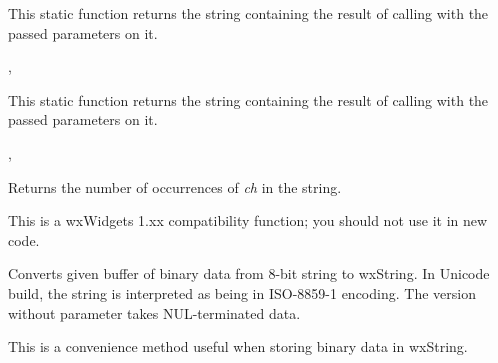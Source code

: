 \label{wxstringformat}


This static function returns the string containing the result of calling 
 with the passed parameters on it.


, 


\label{wxstringformatv}


This static function returns the string containing the result of calling 
 with the passed parameters on it.


, 


\label{wxstringfreq}


Returns the number of occurrences of {\it ch} in the string.

This is a wxWidgets 1.xx compatibility function; you should not use it in new code.

\label{wxstringfrom8bitdata}



Converts given buffer of binary data from 8-bit string to wxString. In Unicode
build, the string is interpreted as being in ISO-8859-1 encoding. The version
without  parameter takes NUL-terminated data.

This is a convenience method useful when storing binary data in wxString.





\label{wxstringfromascii}


